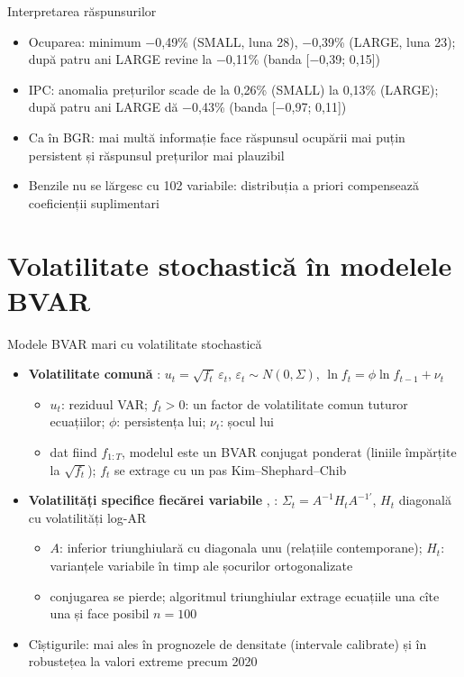 \begin{frame}{Interpretarea răspunsurilor}
\itemsize{\small}
\begin{itemize}
    \item Ocuparea: minimum \ensuremath{-}0{,}49\% (SMALL, luna 28), \ensuremath{-}0{,}39\% (LARGE, luna 23); după patru ani LARGE revine la \ensuremath{-}0{,}11\% (banda [\ensuremath{-}0{,}39; 0{,}15])
    \item IPC: anomalia prețurilor scade de la 0{,}26\% (SMALL) la 0{,}13\% (LARGE); după patru ani LARGE dă \ensuremath{-}0{,}43\% (banda [\ensuremath{-}0{,}97; 0{,}11])
    \item Ca în BGR: mai multă informație face răspunsul ocupării mai puțin persistent și răspunsul prețurilor mai plauzibil
    \item Benzile nu se lărgesc cu 102 variabile: distribuția a priori compensează coeficienții suplimentari
\end{itemize}
\end{frame}


\section{Volatilitate stochastică în modelele BVAR}

\begin{frame}{Modele BVAR mari cu volatilitate stochastică}
\itemsize{\small}
\begin{itemize}
    \item \textbf{Volatilitate comună} : $u_t = \sqrt{f_t}\,\varepsilon_t$, $\varepsilon_t \sim N(0, \Sigma)$, $\ln f_t = \phi\ln f_{t-1} + \nu_t$
    \begin{itemize}
        \item $u_t$: reziduul VAR; $f_t > 0$: un factor de volatilitate comun tuturor ecuațiilor; $\phi$: persistența lui; $\nu_t$: șocul lui
        \item dat fiind $f_{1:T}$, modelul este un BVAR conjugat ponderat (liniile împărțite la $\sqrt{f_t}$); $f_t$ se extrage cu un pas Kim--Shephard--Chib
    \end{itemize}
    \item \textbf{Volatilități specifice fiecărei variabile} , : $\Sigma_t = A^{-1}H_tA^{-1\prime}$, $H_t$ diagonală cu volatilități log-AR 
    \begin{itemize}
        \item $A$: inferior triunghiulară cu diagonala unu (relațiile contemporane); $H_t$: varianțele variabile în timp ale șocurilor ortogonalizate
        \item conjugarea se pierde; algoritmul triunghiular extrage ecuațiile una cîte una și face posibil $n = 100$
    \end{itemize}
    \item Cîștigurile: mai ales în prognozele de densitate (intervale calibrate) și în robustețea la valori extreme precum 2020
\end{itemize}
\end{frame}

